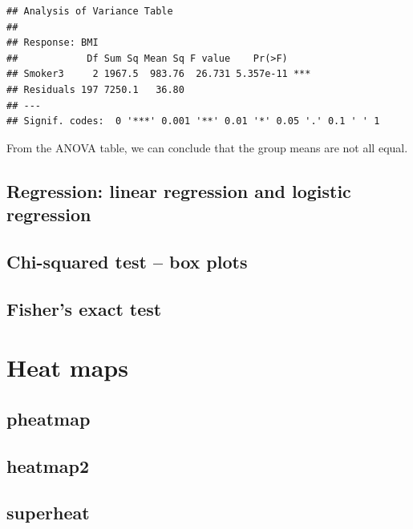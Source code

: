 \documentclass[
]{book}
\begin{document}
\begin{verbatim}
## Analysis of Variance Table
## 
## Response: BMI
##            Df Sum Sq Mean Sq F value    Pr(>F)    
## Smoker3     2 1967.5  983.76  26.731 5.357e-11 ***
## Residuals 197 7250.1   36.80                      
## ---
## Signif. codes:  0 '***' 0.001 '**' 0.01 '*' 0.05 '.' 0.1 ' ' 1
\end{verbatim}

From the ANOVA table, we can conclude that the group means are not all equal.

\hypertarget{regression-linear-regression-and-logistic-regression}{%
\subsection{Regression: linear regression and logistic regression}\label{regression-linear-regression-and-logistic-regression}}

\hypertarget{chi-squared-test-box-plots}{%
\subsection{Chi-squared test -- box plots}\label{chi-squared-test-box-plots}}

\hypertarget{fishers-exact-test}{%
\subsection{Fisher's exact test}\label{fishers-exact-test}}

\hypertarget{heat-maps}{%
\section{Heat maps}\label{heat-maps}}

\hypertarget{pheatmap}{%
\subsection{pheatmap}\label{pheatmap}}

\hypertarget{heatmap2}{%
\subsection{heatmap2}\label{heatmap2}}

\hypertarget{superheat}{%
\subsection{superheat}\label{superheat}}
\end{document}
